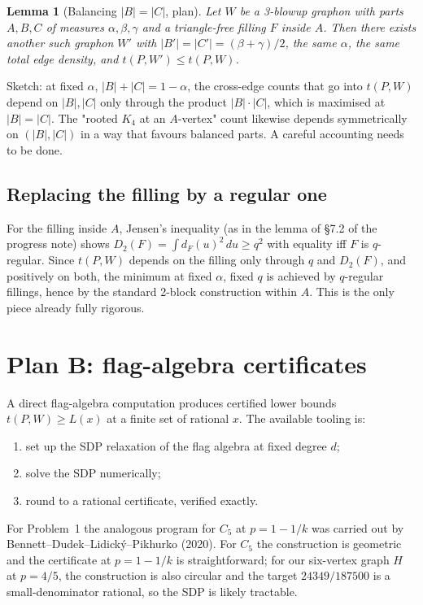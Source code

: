 \documentclass[11pt]{amsart}
\newtheorem{lemma}[theorem]{Lemma}
\theoremstyle{definition}
\newcommand{\dd}{\,d}
\begin{document}
\begin{lemma}[Balancing $|B|=|C|$, plan]
\label{lem:balancing}
Let $W$ be a 3-blowup graphon with parts $A,B,C$ of measures $\alpha,\beta,\gamma$
and a triangle-free filling $F$ inside $A$.  Then there exists another such
graphon $W'$ with $|B'|=|C'|=(\beta+\gamma)/2$, the same $\alpha$, the same
total edge density, and $t(P,W')\le t(P,W)$.
\end{lemma}

Sketch: at fixed $\alpha$, $|B|+|C|=1-\alpha$, the cross-edge counts that go
into $t(P,W)$ depend on $|B|,|C|$ only through the product $|B|\cdot|C|$, which
is maximised at $|B|=|C|$.  The "rooted $K_4$ at an $A$-vertex" count likewise
depends symmetrically on $(|B|,|C|)$ in a way that favours balanced parts.
A careful accounting needs to be done.

\subsection{Replacing the filling by a regular one}

For the filling inside $A$, Jensen's inequality (as in the lemma of §7.2 of the
progress note) shows $D_2(F)=\int d_F(u)^2\dd u\ge q^2$ with equality iff $F$ is $q$-regular.
Since $t(P,W)$ depends on the filling only through $q$ and $D_2(F)$, and
positively on both, the minimum at fixed $\alpha$, fixed $q$ is achieved by
$q$-regular fillings, hence by the standard 2-block construction within $A$.
This is the only piece already fully rigorous.

\section{Plan B: flag-algebra certificates}

A direct flag-algebra computation produces certified lower bounds
$t(P,W) \ge L(x)$ at a finite set of rational $x$.  The available tooling is:
\begin{enumerate}[label=(\arabic*)]
\item set up the SDP relaxation of the flag algebra at fixed degree $d$;
\item solve the SDP numerically;
\item round to a rational certificate, verified exactly.
\end{enumerate}
For Problem~1 the analogous program for $C_5$ at $p=1-1/k$ was carried out by
Bennett--Dudek--Lidický--Pikhurko (2020).  For $C_5$ the construction is
geometric and the certificate at $p=1-1/k$ is straightforward; for our
six-vertex graph $H$ at $p=4/5$, the construction is also circular and the
target $24349/187500$ is a small-denominator rational, so the SDP is likely
tractable.
\end{document}
